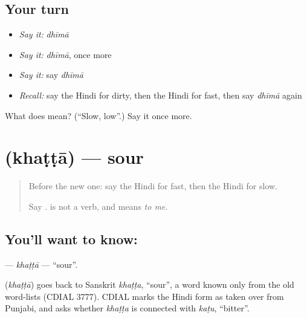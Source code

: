 \subsection*{Your turn}
\begin{itemize}
\raggedright
  \item \emph{Say it:} \emph{dhīmā}
  \item \emph{Say it:} \emph{dhīmā}, once more
  \item \emph{Say it:} say \emph{dhīmā}
  \item \emph{Recall:} say the Hindi for dirty, then the Hindi for fast, then say \emph{dhīmā} again
\end{itemize}

\begin{tcolorbox}[breakable,colback=teal!4,colframe=teal!35!black,title={Before you move on}]
What does  mean? (\textquotedblleft{}Slow, low\textquotedblright{}.) Say it once more.
\end{tcolorbox}
\section[\texorpdfstring{\hi{खट्टा} (khaṭṭā)}{खट्टा (khaṭṭā)}]{ (khaṭṭā) — sour}

\label{lesson:HI-C156-khatta}



\begin{quote}
Before the new one: say the Hindi for fast, then the Hindi for slow.

Say \textbf{   }. \textbf{} is not a verb, and \textbf{} means \emph{to me}.
\end{quote}

\subsection*{You'll want to know: }
\textbf{} — \emph{khaṭṭā} — \textquotedblleft{}sour\textquotedblright{}.

\begin{cousinweb}
\textbf{} (\emph{khaṭṭā}) goes back to Sanskrit \emph{khaṭṭa}, \textquotedblleft{}sour\textquotedblright{}, a word known only from the old word-lists (CDIAL 3777). CDIAL marks the Hindi form as taken over from Punjabi, and asks whether \emph{khaṭṭa} is connected with \emph{kaṭu}, \textquotedblleft{}bitter\textquotedblright{}.
\end{cousinweb}

